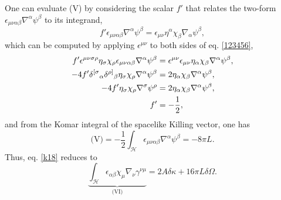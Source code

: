 \documentclass[
12pt,		%
openright,	%
twoside,  %
a4paper,			%
chapter=TITLE,		%
english,			%
french,				%
spanish,			%
brazil				%
]{USPSC-classe/USPSC}
\begin{document}
One can evaluate (V) by considering the scalar $f'$ that relates the two-form $\epsilon_{\mu\nu\alpha\beta}\nabla^{\alpha}\psi^{\beta}$ to its integrand,
\begin{equation}\label{123456}
     f' \epsilon_{\mu\nu\alpha\beta}\nabla^{\alpha}\psi^{\beta}=\epsilon_{\mu\nu}\eta^{\alpha}\chi_{\beta}\nabla_{\alpha}\psi^{\beta},
\end{equation}
which can be computed by applying $\epsilon^{\mu\nu}$ to both sides of eq. \ref{123456},
\begin{equation}
\begin{aligned}[b]
  f' \epsilon^{\mu\nu\sigma\rho}\eta_{\sigma}\chi_{\rho}\epsilon_{\mu\nu\alpha\beta}\nabla^{\alpha}\psi^{\beta}&=\epsilon^{\mu\nu}\epsilon_{\mu\nu}\eta_{\alpha}\chi_{\beta}\nabla^{\alpha}\psi^{\beta}, \\
 -4f'\delta^{[\sigma}\mathstrut_{\alpha}\delta^{\rho]}\mathstrut_{\beta} \eta_{\sigma}\chi_{\rho}\nabla^{\alpha}\psi^{\beta}&=2\eta_{\alpha}\chi_{\beta}\nabla^{\alpha}\psi^{\beta}, \\
-4f'\eta_{\sigma}\chi_{\rho}\nabla^{\sigma}\psi^{\rho}&=2\eta_{\alpha}\chi_{\beta}\nabla^{\alpha}\psi^{\beta}, \\
 f'&=-\frac{1}{2},
\end{aligned}    
\end{equation}
and from the Komar integral of the spacelike Killing vector, one has
\begin{equation}
    \text{(V)}=-\frac{1}{2}\int_{\mathscr{H}}\epsilon_{\mu\nu\alpha\beta}\nabla^{\alpha}\psi^{\beta}=-8\pi L.
\end{equation}
Thus, eq. \ref{k18} reduces to
\begin{equation}
    \underbrace{\int_{\mathscr{H}}\epsilon_{\alpha\beta}\chi_{\mu}\nabla_{\nu}\gamma^{\nu\mu}}_{\text{(VI)}}=2A\delta\kappa +16\pi L\delta\Omega.
\end{equation}
\end{document}
